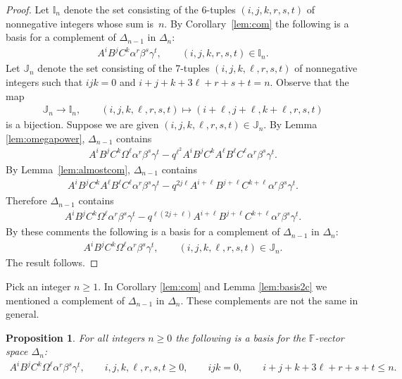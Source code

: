 \documentclass[pdftex]{sigma}
\numberwithin{equation}{section}
\newtheorem{Proposition}[Theorem]{Proposition}
{\theoremstyle{definition}
\newtheorem{Note}[Theorem]{Note}
\newtheorem{Definition}[Theorem]{Definition}
\newtheorem{Problem}[Theorem]{Problem}
}
\begin{document}
\begin{proof}
Let $\mathbb I_n$ denote the set consisting of the 6-tuples
$(i,j,k,r,s,t)$ of nonnegative integers whose sum is~$n$.
By Corollary~\ref{lem:com} the
following
is a basis for a complement of
$\Delta_{n-1}$ in $\Delta_n$:
\begin{gather*}
A^iB^jC^k\alpha^r\beta^s\gamma^t, \qquad
(i,j,k,r,s,t) \in {\mathbb I}_n.
\end{gather*}
Let $\mathbb J_n$ denote the set consisting of the 7-tuples
$(i,j,k,\ell,r,s,t)$ of nonnegative integers such that
$ijk=0$ and
$i+j+k+3\ell+r+s+t = n$.
Observe that the map
\begin{gather*}
\mathbb J_n  \to  \mathbb I_n,
\qquad
(i,j,k,\ell,r,s,t)  \mapsto   (i+\ell,j+\ell,k+\ell,r,s,t)
\end{gather*}
is a bijection.
Suppose we are given $(i,j,k,\ell,r,s,t) \in \mathbb J_n$.
By
Lemma \ref{lem:omegapower},
$\Delta_{n-1}$ contains
\begin{gather*}
A^iB^jC^k\Omega^\ell \alpha^r \beta^s \gamma^t -
q^{\ell^2} A^iB^jC^k A^\ell B^\ell C^\ell \alpha^r \beta^s \gamma^t.
\end{gather*}
By Lemma~\ref{lem:almostcom},  $\Delta_{n-1}$ contains
\begin{gather*}
A^iB^jC^k A^\ell B^\ell C^\ell \alpha^r \beta^s \gamma^t
-
q^{2j \ell} A^{i+\ell}B^{j+\ell}C^{k+\ell}  \alpha^r \beta^s \gamma^t.
\end{gather*}
Therefore $\Delta_{n-1}$ contains
\begin{gather*}
A^iB^jC^k\Omega^\ell \alpha^r \beta^s \gamma^t -
q^{\ell(2j+ \ell)} A^{i+\ell}B^{j+\ell}C^{k+\ell}  \alpha^r \beta^s \gamma^t.
\end{gather*}
By these comments the following is a basis for a complement of
$\Delta_{n-1}$ in $\Delta_n$:
\begin{gather*}
A^iB^jC^k\Omega^\ell \alpha^r\beta^s\gamma^t, \qquad
(i,j,k,\ell,r,s,t) \in \mathbb J_n.
\end{gather*}
The result follows.
\end{proof}

\begin{Note}
Pick an integer $n \geq 1$.
In
Corollary
\ref{lem:com} and
Lemma
\ref{lem:basis2c}
we mentioned a
complement of $\Delta_{n-1}$ in $\Delta_n$. These
complements are not the same
in general.
\end{Note}


\begin{Proposition}
\label{lem:basis2n}
For all integers $n\geq 0$
the following is a basis
for
the $\mathbb F$-vector space
$\Delta_n$:
\begin{gather*}
 A^iB^jC^k\Omega^\ell \alpha^r \beta^s \gamma^t, \qquad
i,j,k,\ell, r,s,t\geq 0,
\qquad ijk=0,
 \qquad
i+j+k+3\ell+r+s+t \leq  n.
\end{gather*}
\end{Proposition}
\end{document}
